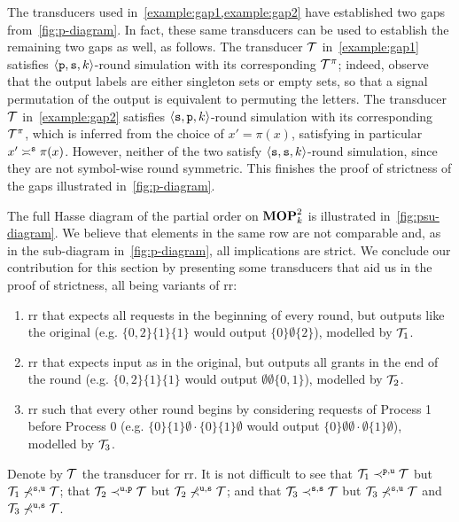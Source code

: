 The transducers used in~\cref{example:gap1,example:gap2} have established two gaps from~\cref{fig:p-diagram}. In fact, these same transducers can be used to establish the remaining two gaps as well, as follows. The transducer $\cT$ in~\cref{example:gap1} satisfies $\tup{\rstype{p},\rstype{s},k}$-round simulation with its corresponding $\cT^\pi$; indeed, observe that the output labels are either singleton sets or empty sets, so that a signal permutation of the output is equivalent to permuting the letters. The transducer $\cT$ in~\cref{example:gap2} satisfies $\tup{\rstype{s},\rstype{p},k}$-round simulation with its corresponding $\cT^\pi$, which is inferred from the choice of $x'=\pi(x)$, satisfying in particular $x'\reqtype[]{s} \pi(x)$. However, neither of the two satisfy $\tup{\rstype{s},\rstype{s},k}$-round simulation, since they are not symbol-wise round symmetric. This finishes the proof of strictness of the gaps illustrated in~\cref{fig:p-diagram}.

The full Hasse diagram of the partial order on $\RSTUPS$ is illustrated in~\cref{fig:psu-diagram}. We believe that elements in the same row are not comparable and, as in the sub-diagram in~\cref{fig:p-diagram}, all implications are strict. We conclude our contribution for this section by presenting some transducers that aid us in the proof of strictness, all being variants of \gls{rr}:
\begin{enumerate}
    \item \Gls{rr} that expects all requests in the beginning of every round, but outputs like the original (e.g. $\{0,2\}\{1\}\{1\}$ would output $\{0\}\emptyset\{2\}$), modelled by $\cT_1$.
    \item \Gls{rr} that expects input as in the original, but outputs all grants in the end of the round (e.g. $\{0,2\}\{1\}\{1\}$ would output $\emptyset\emptyset\{0,1\}$), modelled by $\cT_2$.
    \item \Gls{rr} such that every other round begins by considering requests of Process 1 before Process 0 (e.g. $\{0\}\{1\}\emptyset\cdot\{0\}\{1\}\emptyset$ would output $\{0\}\emptyset\emptyset\cdot\emptyset\{1\}\emptyset$), modelled by $\cT_3$.
\end{enumerate}
Denote by $\cT$ the transducer for \gls{rr}. It is not difficult to see that $\cT_1\prectype{p}{u} \cT$ but $\cT_1\not\prectype{s}{u} \cT$; that $\cT_2\prectype{u}{p} \cT$ but $\cT_2\not\prectype{u}{s} \cT$; and that $\cT_3\prectype{s}{s} \cT$ but $\cT_3\not\prectype{s}{u} \cT$ and $\cT_3\not\prectype{u}{s} \cT$.

